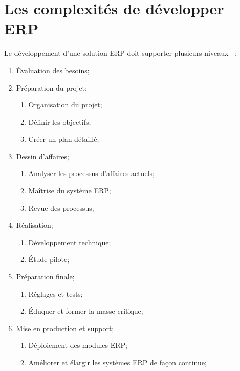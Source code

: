 \label{sec:RevLitt}

\section{Les complexités de développer ERP}

Le développement d’une solution ERP doit supporter plusieurs niveaux~\cite{uqam_erp_benefice_2008} : 
\begin{enumerate}
    \item Évaluation des besoins;
    \item Préparation du projet;
    \begin{enumerate}
        \item Organisation du projet;
        \item Définir les objectifs;
        \item Créer un plan détaillé;
    \end{enumerate}
    \item Dessin d’affaires;
    \begin{enumerate}
        \item Analyser les processus d’affaires actuels;
        \item Maîtrise du système ERP;
        \item Revue des processus;
    \end{enumerate}
    \item Réalisation;
    \begin{enumerate}
        \item Développement technique;
        \item Étude pilote;
    \end{enumerate}
    \item Préparation finale;
    \begin{enumerate}
        \item Réglages et tests;
        \item Éduquer et former la masse critique;
    \end{enumerate}
    \item Mise en production et support;
    \begin{enumerate}
        \item Déploiement des modules ERP;
        \item Améliorer et élargir les systèmes ERP de façon continue;
    \end{enumerate}
\end{enumerate}

